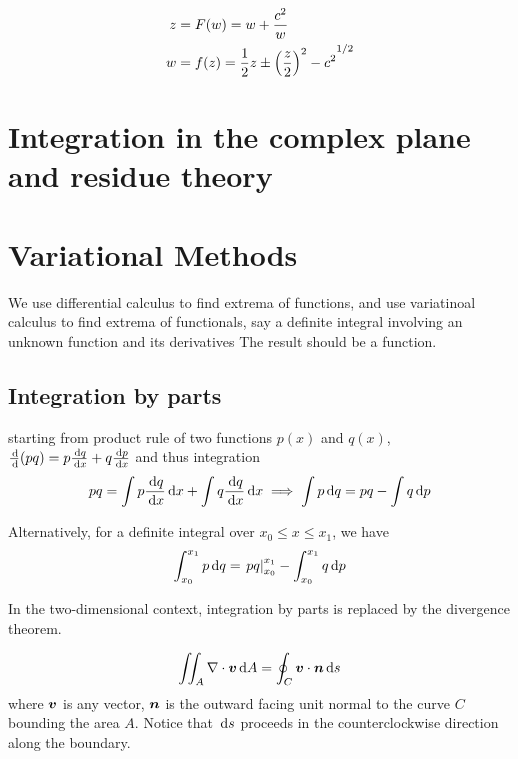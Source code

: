 \documentclass{article}
\begin{document}
\begin{align*}
    z &= F(w)=w+\frac{c^2}{w}\\
    w &= f(z)=\frac{1}{2}z\pm {\left( \frac{z}{2} \right)^2-c^2}^{1/2}
\end{align*}

\section{Integration in the complex plane and residue theory}
\section{Variational Methods}

We use differential calculus to find extrema of functions, and use variatinoal calculus to find extrema of functionals, say a definite integral involving an unknown function and its derivatives The result should be a function.

\subsection{Integration by parts}

starting from product rule of two functions \(p(x)\) and \(q(x)\), \(\frac{\,\mathrm{d}}{\,\mathrm{d}}(pq) = p\frac{\,\mathrm{d} q}{\,\mathrm{d} x}+q\frac{\,\mathrm{d} p}{\,\mathrm{d} x}\) and thus integration
\[pq = \int p\frac{\,\mathrm{d} q}{\,\mathrm{d} x} \,\mathrm{d} x+\int q\frac{\,\mathrm{d} q}{\,\mathrm{d} x}\,\mathrm{d} x\implies \int p\,\mathrm{d} q = pq-\int q\,\mathrm{d} p\]

Alternatively, for a definite integral over \(x_0\leq x\leq x_1\), we have
\[\int_{x_0}^{x_1} p\,\mathrm{d} q = \left.pq\right|_{x_0}^{x_1}-\int_{x_0}^{x_1} q\,\mathrm{d} p\]

In the two-dimensional context, integration by parts is replaced by the divergence theorem.

\begin{theorem}
    \[\iint_A \nabla\cdot \boldsymbol{v}\,\mathrm{d} A = \oint_C\boldsymbol{v}\cdot \boldsymbol{n}\,\mathrm{d} s\]
    where \(\boldsymbol{v}\) is any vector, \(\boldsymbol{n}\) is the outward facing unit normal to the curve \(C\) bounding the area \(A\). Notice that \(\,\mathrm{d} s\) proceeds in the counterclockwise direction along the boundary.
\end{theorem}
\end{document}
